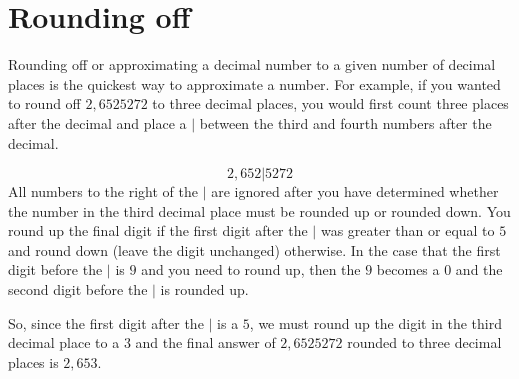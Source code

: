 \section{Rounding off}
\nopagebreak
Rounding off or approximating a decimal number to a given number of decimal places is the quickest way to approximate a number. For example, if you wanted to round off $2,6525272$ to three decimal places, you would first count three places after the decimal and place a $|$ between the third and fourth numbers after the decimal.\par 

\begin{equation*}
2,652|5272
\end{equation*}
All numbers to the right of the $|$ are ignored after you have determined whether the number in the third decimal place must be rounded up or rounded down. You round up the final digit if the first digit after the $|$ was greater than or equal to $5$ and round down (leave the digit unchanged) otherwise. In the case that the first digit before the $|$ is $9$ and you need to round up, then the $9$ becomes a $0$ and the second digit before the $|$ is rounded up.\par 
So, since the first digit after the $|$ is a $5$, we must round up the digit in the third decimal place to a $3$ and the final answer of $2,6525272$ rounded to three decimal places is $2,653$.
\par


